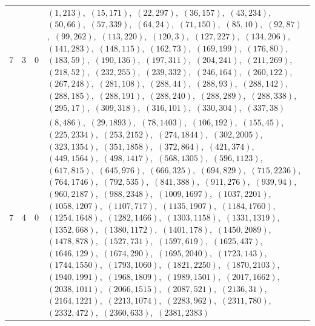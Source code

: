 \documentclass[11pt]{article}
\begin{document}
\begin{longtable}{@{}rrl>{\raggedright\arraybackslash}p{}@{}}
7 & 3 & $0$ & $(1,213)$,\allowbreak\ $(15,171)$,\allowbreak\ $(22,297)$,\allowbreak\ $(36,157)$,\allowbreak\ $(43,234)$,\allowbreak\ $(50,66)$,\allowbreak\ $(57,339)$,\allowbreak\ $(64,24)$,\allowbreak\ $(71,150)$,\allowbreak\ $(85,10)$,\allowbreak\ $(92,87)$,\allowbreak\ $(99,262)$,\allowbreak\ $(113,220)$,\allowbreak\ $(120,3)$,\allowbreak\ $(127,227)$,\allowbreak\ $(134,206)$,\allowbreak\ $(141,283)$,\allowbreak\ $(148,115)$,\allowbreak\ $(162,73)$,\allowbreak\ $(169,199)$,\allowbreak\ $(176,80)$,\allowbreak\ $(183,59)$,\allowbreak\ $(190,136)$,\allowbreak\ $(197,311)$,\allowbreak\ $(204,241)$,\allowbreak\ $(211,269)$,\allowbreak\ $(218,52)$,\allowbreak\ $(232,255)$,\allowbreak\ $(239,332)$,\allowbreak\ $(246,164)$,\allowbreak\ $(260,122)$,\allowbreak\ $(267,248)$,\allowbreak\ $(281,108)$,\allowbreak\ $(288,44)$,\allowbreak\ $(288,93)$,\allowbreak\ $(288,142)$,\allowbreak\ $(288,185)$,\allowbreak\ $(288,191)$,\allowbreak\ $(288,240)$,\allowbreak\ $(288,289)$,\allowbreak\ $(288,338)$,\allowbreak\ $(295,17)$,\allowbreak\ $(309,318)$,\allowbreak\ $(316,101)$,\allowbreak\ $(330,304)$,\allowbreak\ $(337,38)$\\
7 & 4 & $0$ & $(8,486)$,\allowbreak\ $(29,1893)$,\allowbreak\ $(78,1403)$,\allowbreak\ $(106,192)$,\allowbreak\ $(155,45)$,\allowbreak\ $(225,2334)$,\allowbreak\ $(253,2152)$,\allowbreak\ $(274,1844)$,\allowbreak\ $(302,2005)$,\allowbreak\ $(323,1354)$,\allowbreak\ $(351,1858)$,\allowbreak\ $(372,864)$,\allowbreak\ $(421,374)$,\allowbreak\ $(449,1564)$,\allowbreak\ $(498,1417)$,\allowbreak\ $(568,1305)$,\allowbreak\ $(596,1123)$,\allowbreak\ $(617,815)$,\allowbreak\ $(645,976)$,\allowbreak\ $(666,325)$,\allowbreak\ $(694,829)$,\allowbreak\ $(715,2236)$,\allowbreak\ $(764,1746)$,\allowbreak\ $(792,535)$,\allowbreak\ $(841,388)$,\allowbreak\ $(911,276)$,\allowbreak\ $(939,94)$,\allowbreak\ $(960,2187)$,\allowbreak\ $(988,2348)$,\allowbreak\ $(1009,1697)$,\allowbreak\ $(1037,2201)$,\allowbreak\ $(1058,1207)$,\allowbreak\ $(1107,717)$,\allowbreak\ $(1135,1907)$,\allowbreak\ $(1184,1760)$,\allowbreak\ $(1254,1648)$,\allowbreak\ $(1282,1466)$,\allowbreak\ $(1303,1158)$,\allowbreak\ $(1331,1319)$,\allowbreak\ $(1352,668)$,\allowbreak\ $(1380,1172)$,\allowbreak\ $(1401,178)$,\allowbreak\ $(1450,2089)$,\allowbreak\ $(1478,878)$,\allowbreak\ $(1527,731)$,\allowbreak\ $(1597,619)$,\allowbreak\ $(1625,437)$,\allowbreak\ $(1646,129)$,\allowbreak\ $(1674,290)$,\allowbreak\ $(1695,2040)$,\allowbreak\ $(1723,143)$,\allowbreak\ $(1744,1550)$,\allowbreak\ $(1793,1060)$,\allowbreak\ $(1821,2250)$,\allowbreak\ $(1870,2103)$,\allowbreak\ $(1940,1991)$,\allowbreak\ $(1968,1809)$,\allowbreak\ $(1989,1501)$,\allowbreak\ $(2017,1662)$,\allowbreak\ $(2038,1011)$,\allowbreak\ $(2066,1515)$,\allowbreak\ $(2087,521)$,\allowbreak\ $(2136,31)$,\allowbreak\ $(2164,1221)$,\allowbreak\ $(2213,1074)$,\allowbreak\ $(2283,962)$,\allowbreak\ $(2311,780)$,\allowbreak\ $(2332,472)$,\allowbreak\ $(2360,633)$,\allowbreak\ $(2381,2383)$\\

\end{longtable}
\end{document}
